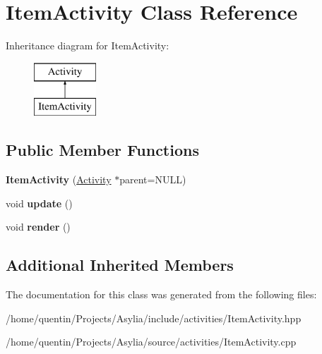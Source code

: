 \hypertarget{classItemActivity}{\section{Item\-Activity Class Reference}
\label{classItemActivity}
}
Inheritance diagram for Item\-Activity\-:\begin{figure}[H]
\begin{center}
\leavevmode
\includegraphics[height=2.000000cm]{classItemActivity}
\end{center}
\end{figure}
\subsection*{Public Member Functions}
\begin{DoxyCompactItemize}
\item 
\hypertarget{classItemActivity_ad3b0d09bac74cba07d8b7c26a58b052f}{{\bfseries Item\-Activity} (\hyperlink{classActivity}{Activity} $\ast$parent=N\-U\-L\-L)}\label{classItemActivity_ad3b0d09bac74cba07d8b7c26a58b052f}

\item 
\hypertarget{classItemActivity_a3008b715c5beb3f9074ba81f466a50d4}{void {\bfseries update} ()}\label{classItemActivity_a3008b715c5beb3f9074ba81f466a50d4}

\item 
\hypertarget{classItemActivity_ae78b5babbc77ceaf4c4a9da199431f7a}{void {\bfseries render} ()}\label{classItemActivity_ae78b5babbc77ceaf4c4a9da199431f7a}

\end{DoxyCompactItemize}
\subsection*{Additional Inherited Members}


The documentation for this class was generated from the following files\-:\begin{DoxyCompactItemize}
\item 
/home/quentin/\-Projects/\-Asylia/include/activities/Item\-Activity.\-hpp\item 
/home/quentin/\-Projects/\-Asylia/source/activities/Item\-Activity.\-cpp\end{DoxyCompactItemize}
